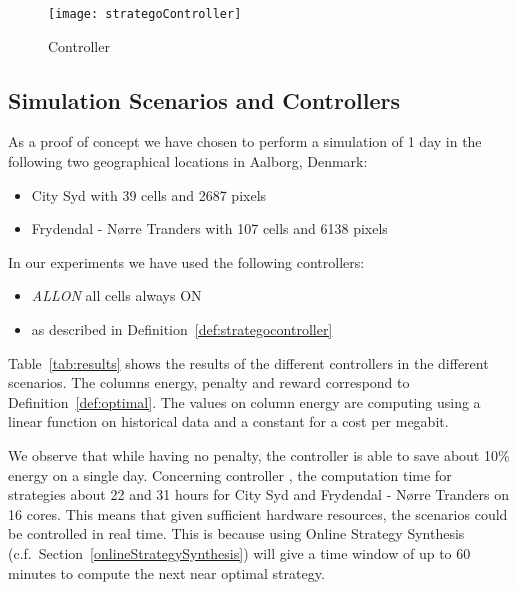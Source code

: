 \begin{figure}[t]
  \centering
  \texttt{[image: strategoController]}
  \caption{\stratego Controller}
  \label{fig:strategocontroller}
\end{figure}




\subsection{Simulation Scenarios and Controllers}

As a proof of concept we have chosen to perform a simulation of 1 day
in the following two geographical locations in Aalborg, Denmark:

\begin{itemize}
\item City Syd with 39 cells and 2687 pixels   
\item Frydendal - Nørre Tranders  with 107 cells and 6138 pixels
\end{itemize}  

In our experiments we have used the following controllers:

\begin{itemize}
\item \emph{ALLON} all cells always ON
\item \stratego as described in Definition~\ref{def:strategocontroller}
\end{itemize}

Table~\ref{tab:results} shows the results of the different controllers
in the different scenarios. The columns energy, penalty and reward
correspond to Definition~\ref{def:optimal}. The values on column
energy are computing using a linear function on historical data and a
constant for a cost per megabit. 

We observe that while having no penalty, the \stratego controller is
able to save about 10\% energy on a single day. Concerning controller
\stratego, the computation time for strategies about 22 and 31 hours
for City Syd and Frydendal - Nørre Tranders on 16 cores. This means
that given sufficient hardware resources, the scenarios could be
controlled in real time. This is because using Online Strategy
Synthesis (c.f.\ Section~\ref{onlineStrategySynthesis}) will give a
time window of up to 60 minutes to compute the next near optimal
strategy.

